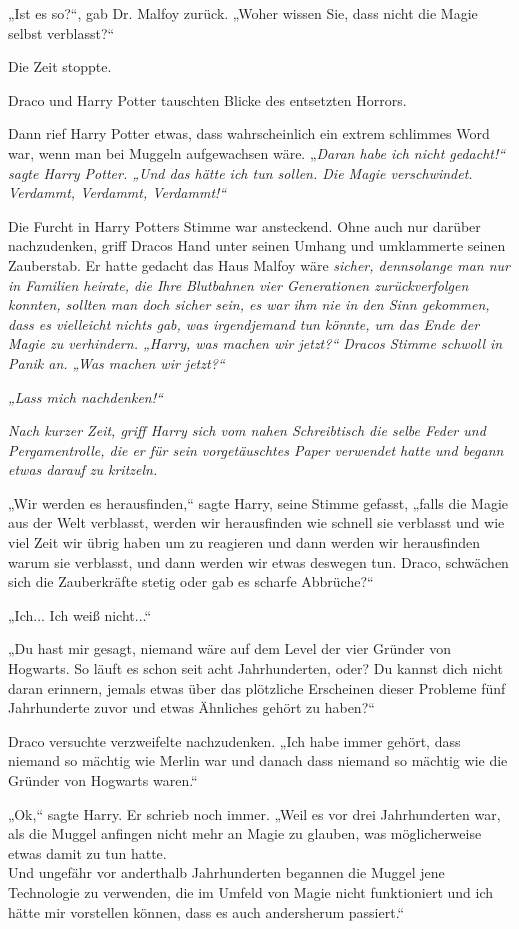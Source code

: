 {„Ist es so?“, gab Dr. Malfoy zurück. „Woher wissen Sie, dass nicht die Magie selbst verblasst?“

Die Zeit stoppte.

Draco und Harry Potter tauschten Blicke des entsetzten Horrors.

Dann rief Harry Potter etwas, dass wahrscheinlich ein extrem schlimmes Word war, wenn man bei Muggeln aufgewachsen wäre. „\emph{Daran habe ich nicht gedacht!“ sagte Harry Potter. „Und das hätte ich tun sollen. Die Magie verschwindet. Verdammt, Verdammt, Verdammt!“}

Die Furcht in Harry Potters Stimme war ansteckend. Ohne auch nur darüber nachzudenken, griff Dracos Hand unter seinen Umhang und umklammerte seinen Zauberstab. Er hatte gedacht das Haus Malfoy wäre \emph{sicher, dennsolange man nur in Familien heirate, die Ihre Blutbahnen vier Generationen zurückverfolgen konnten, sollten man doch \emph{sicher} sein, es war ihm nie in den Sinn gekommen, dass es vielleicht nichts gab, was irgendjemand tun könnte, um das Ende der Magie zu verhindern. „Harry, was machen wir jetzt?“ Dracos Stimme schwoll in Panik an. \emph{„Was machen wir jetzt?“}}

\emph{„Lass mich nachdenken!“}

\emph{Nach kurzer Zeit, griff Harry sich vom nahen Schreibtisch die selbe Feder und Pergamentrolle, die er für sein vorgetäuschtes Paper verwendet hatte und begann etwas darauf zu kritzeln.}

„Wir werden es herausfinden,“ sagte Harry, seine Stimme gefasst, „falls die Magie aus der Welt verblasst, werden wir herausfinden wie schnell sie verblasst und wie viel Zeit wir übrig haben um zu reagieren und dann werden wir herausfinden warum sie verblasst, und dann werden wir etwas deswegen tun. Draco, schwächen sich die Zauberkräfte stetig oder gab es scharfe Abbrüche?“

„Ich... Ich weiß nicht...“

„Du hast mir gesagt, niemand wäre auf dem Level der vier Gründer von Hogwarts. So läuft es schon seit acht Jahrhunderten, oder? Du kannst dich nicht daran erinnern, jemals etwas über das plötzliche Erscheinen dieser Probleme fünf Jahrhunderte zuvor und etwas Ähnliches gehört zu haben?“

Draco versuchte verzweifelte nachzudenken. „Ich habe immer gehört, dass niemand so mächtig wie Merlin war und danach dass niemand so mächtig wie die Gründer von Hogwarts waren.“

„Ok,“ sagte Harry. Er schrieb noch immer. „Weil es vor drei Jahrhunderten war, als die Muggel anfingen nicht mehr an Magie zu glauben, was möglicherweise etwas damit zu tun hatte.\\ Und ungefähr vor anderthalb Jahrhunderten begannen die Muggel jene Technologie zu verwenden, die im Umfeld von Magie nicht funktioniert und ich hätte mir vorstellen können, dass es auch andersherum passiert.“

}
